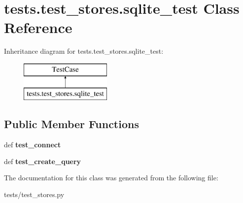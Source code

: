 \hypertarget{classtests_1_1test__stores_1_1sqlite__test}{\section{tests.\-test\-\_\-stores.\-sqlite\-\_\-test Class Reference}
\label{classtests_1_1test__stores_1_1sqlite__test}
}
Inheritance diagram for tests.\-test\-\_\-stores.\-sqlite\-\_\-test\-:\begin{figure}[H]
\begin{center}
\leavevmode
\includegraphics[height=2.000000cm]{classtests_1_1test__stores_1_1sqlite__test}
\end{center}
\end{figure}
\subsection*{Public Member Functions}
\begin{DoxyCompactItemize}
\item 
\hypertarget{classtests_1_1test__stores_1_1sqlite__test_ac7e870c7b3992aaebbe7b79c745da8fd}{def {\bfseries test\-\_\-connect}}\label{classtests_1_1test__stores_1_1sqlite__test_ac7e870c7b3992aaebbe7b79c745da8fd}

\item 
\hypertarget{classtests_1_1test__stores_1_1sqlite__test_a089d774289e05ab810966484c380907b}{def {\bfseries test\-\_\-create\-\_\-query}}\label{classtests_1_1test__stores_1_1sqlite__test_a089d774289e05ab810966484c380907b}

\end{DoxyCompactItemize}


The documentation for this class was generated from the following file\-:\begin{DoxyCompactItemize}
\item 
tests/test\-\_\-stores.\-py\end{DoxyCompactItemize}
